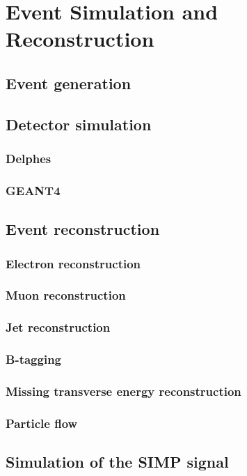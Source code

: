 \graphicspath{{chapt_dutch/}{intro/}{chapt2/}{chapt3/}{chapt4/}{chapt5/}}

\renewcommand\evenpagerightmark{{\scshape\small Chapter 4}}
\renewcommand\oddpageleftmark{{\scshape\small Grid Service Management}}

\hyphenation{}

\chapter{Event Simulation and Reconstruction}
\label{ch4}

\section{Event generation}

\section{Detector simulation}

\subsection{Delphes}

\subsection{GEANT4}

\section{Event reconstruction}

\subsection{Electron reconstruction}
\label{sec:electron_reconstruction}

\subsection{Muon reconstruction}
\label{sec:muon_reconstruction}

\subsection{Jet reconstruction}
\label{sec:jet_reconstruction}

\subsection{B-tagging}

\subsection{Missing transverse energy reconstruction}

\subsection{Particle flow}

\section{Simulation of the SIMP signal}


\clearpage
%
%

\clearpage{\pagestyle{empty}\cleardoublepage}
